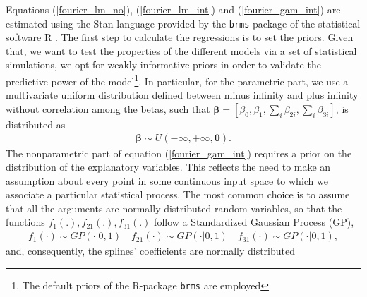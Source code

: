 \documentclass{article}\usepackage[]{graphicx}\usepackage[]{color}
\begin{document}
Equations (\ref{fourier_lm_no}), (\ref{fourier_lm_int}) and (\ref{fourier_gam_int}) are estimated using the Stan language provided by the \texttt{brms} package of the statistical software R . The first step to calculate the regressions is to set the priors. Given that, we want to test the properties of the different models via a set of statistical simulations, we opt for weakly informative priors in order to validate the predictive power of the model\footnote{The default priors of the R-package \texttt{brms} are employed}. In particular, for the parametric part, we use a multivariate uniform distribution defined between minus infinity and plus infinity without correlation among the betas, such that $ \mathbf{\beta} = [\beta_{0}, \beta_{1}, \sum_{i} \beta_{2i}, \sum_{i} \beta_{3i}]$, is distributed as 
\begin{align}
\mathbf{\beta} \sim U(-\infty, +\infty, \mathbf{0}).
\end{align}
The nonparametric part of equation (\ref{fourier_gam_int}) requires a prior on the distribution of the explanatory variables. This reflects the need to make an assumption about every point in some continuous input space to which we associate a particular statistical process. The most common choice is to assume that all the arguments are normally distributed random variables, so that the functions $ f_{1}(.), f_{21}(.), f_{31}(.) $ follow a Standardized Gaussian Process (GP),
\begin{align}\label{GP}
f_1(\cdot) \sim GP(\cdot | 0, 1) \quad f_{21}(\cdot) \sim GP(\cdot | 0, 1) \quad f_{31}(\cdot) \sim GP(\cdot | 0, 1),
\end{align}
and, consequently, the splines' coefficients are normally distributed
\end{document}
